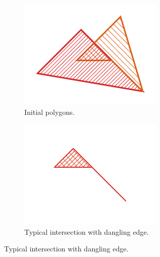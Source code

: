 \documentclass[a4paper,11pt,oneside]{article}
\begin{document}
 
\begin{figure}[ht]
     \centering
     \begin{subfigure}[b]{0.3\textwidth}
         \centering
         \includegraphics[width=\textwidth]{section3/3.2/regularization-initial.png}
         \caption{Initial polygons.}
         \label{sec3.2:initial-intersection}
     \end{subfigure}
     \hfill
     \begin{subfigure}[b]{0.3\textwidth}
         \centering
         \includegraphics[width=\textwidth]{section3/3.2/regularization-non-regular.png}
         \caption{Typical intersection with dangling edge.}
          \label{sec3.2:normal-intersection}

\end{subfigure}
\end{figure}
\end{document}
